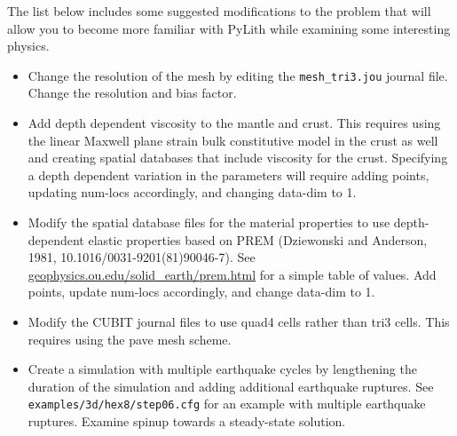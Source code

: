The list below includes some suggested modifications to the problem
that will allow you to become more familiar with PyLith while examining
some interesting physics.
\begin{itemize}
\item Change the resolution of the mesh by editing the \texttt{mesh\_tri3.jou}
journal file. Change the resolution and bias factor.
\item Add depth dependent viscosity to the mantle and crust. This requires
using the linear Maxwell plane strain bulk constitutive model in the
crust as well and creating spatial databases that include viscosity
for the crust. Specifying a depth dependent variation in the parameters
will require adding points, updating num-locs accordingly, and changing
data-dim to 1.
\item Modify the spatial database files for the material properties to use
depth-dependent elastic properties based on PREM (Dziewonski and Anderson,
1981, 10.1016/0031-9201(81)90046-7). See \url{geophysics.ou.edu/solid_earth/prem.html}
for a simple table of values. Add points, update num-locs accordingly,
and change data-dim to 1.
\item Modify the CUBIT journal files to use quad4 cells rather than tri3
cells. This requires using the pave mesh scheme.
\item Create a simulation with multiple earthquake cycles by lengthening
the duration of the simulation and adding additional earthquake ruptures.
See \texttt{examples/3d/hex8/step06.cfg} for an example with multiple
earthquake ruptures. Examine spinup towards a steady-state solution.\end{itemize}


